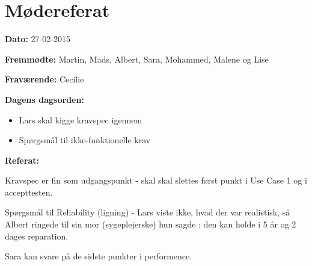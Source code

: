 \chapter{Mødereferat}

\textbf{Dato:} 27-02-2015

\textbf{Fremmødte:} Martin, Mads, Albert, Sara, Mohammed, Malene og Lise 

\textbf{Fraværende:} Cecilie

\textbf{Dagens dagsorden:}
\begin{itemize}
	\item Lars skal kigge kravspec igennem
	\item Spørgsmål til ikke-funktionelle krav
\end{itemize}

\textbf{Referat:}

Kravspec er fin som udgangspunkt - skal skal slettes først punkt i Use Case 1 og i accepttesten. 

Spørgsmål til Reliability (ligning) - Lars viste ikke, hvad der var realistisk, så Albert ringede til sin mor (sygeplejerske) hun sagde : den kan holde i 5 år og 2 dages reparation.

Sara kan svare på de sidste punkter i performence.    